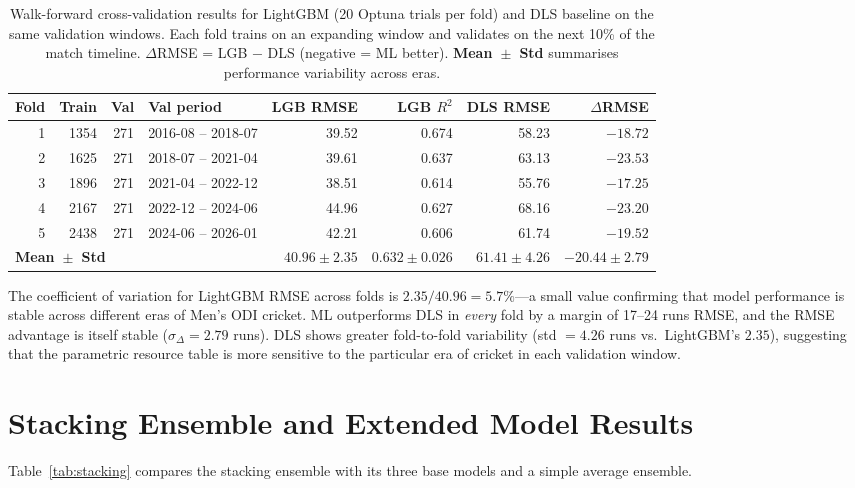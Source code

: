 \documentclass[12pt,a4paper,oneside]{report}
\begin{document}
\begin{table}[htbp]
\centering
\caption[Walk-forward CV results across 5 folds]{Walk-forward cross-validation results for LightGBM (20 Optuna trials per fold) and DLS baseline on the same validation windows.  Each fold trains on an expanding window and validates on the next 10\% of the match timeline.  $\Delta$RMSE = LGB $-$ DLS (negative = ML better).  \textbf{Mean~$\pm$~Std} summarises performance variability across eras.}
\label{tab:wfcv}
\small
\begin{tabular}{rrrlrrrr}
\toprule
\textbf{Fold} & \textbf{Train} & \textbf{Val} & \textbf{Val period} & \textbf{LGB RMSE} & \textbf{LGB $R^2$} & \textbf{DLS RMSE} & $\Delta$\textbf{RMSE} \\
\midrule
1 & 1354 & 271 & 2016-08 -- 2018-07 & 39.52 & 0.674 & 58.23 & $-18.72$ \\
2 & 1625 & 271 & 2018-07 -- 2021-04 & 39.61 & 0.637 & 63.13 & $-23.53$ \\
3 & 1896 & 271 & 2021-04 -- 2022-12 & 38.51 & 0.614 & 55.76 & $-17.25$ \\
4 & 2167 & 271 & 2022-12 -- 2024-06 & 44.96 & 0.627 & 68.16 & $-23.20$ \\
5 & 2438 & 271 & 2024-06 -- 2026-01 & 42.21 & 0.606 & 61.74 & $-19.52$ \\
\midrule
\multicolumn{4}{l}{\textbf{Mean~$\pm$~Std}} & $40.96 \pm 2.35$ & $0.632 \pm 0.026$ & $61.41 \pm 4.26$ & $-20.44 \pm 2.79$ \\
\bottomrule
\end{tabular}
\end{table}

The coefficient of variation for LightGBM RMSE across folds is $2.35/40.96 = 5.7\%$---a small value confirming that model performance is stable across different eras of Men's ODI cricket.  ML outperforms DLS in \emph{every} fold by a margin of 17--24 runs RMSE, and the RMSE advantage is itself stable ($\sigma_\Delta = 2.79$ runs).  DLS shows greater fold-to-fold variability (std $= 4.26$ runs vs.\ LightGBM's $2.35$), suggesting that the parametric resource table is more sensitive to the particular era of cricket in each validation window.

\section{Stacking Ensemble and Extended Model Results}
\label{sec:stacking_results}

Table~\ref{tab:stacking} compares the stacking ensemble with its three base models and a simple average ensemble.
\end{document}
